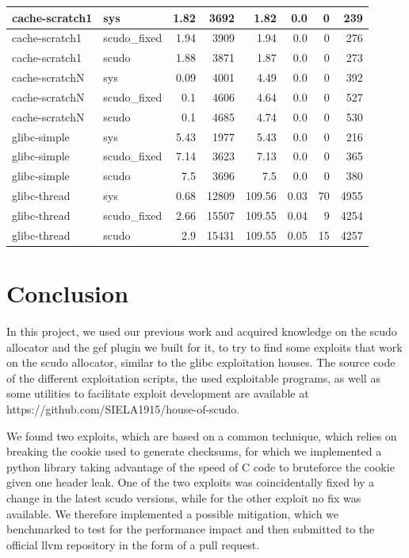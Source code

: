 \documentclass[a4paper,11pt,oneside]{report}
\begin{document}
\begin{longtable}[h]{l l r r r r r r}
  \midrule
  cache-scratch1 & sys & 1.82 & 3692 & 1.82 & 0.0 & 0 & 239 \\
  \midrule
  cache-scratch1 & scudo\_fixed & 1.94 & 3909 & 1.94 & 0.0 & 0 & 276 \\
  \midrule
  cache-scratch1 & scudo & 1.88 & 3871 & 1.87 & 0.0 & 0 & 273 \\
  \midrule
  cache-scratchN & sys & 0.09 & 4001 & 4.49 & 0.0 & 0 & 392 \\
  \midrule
  cache-scratchN & scudo\_fixed & 0.1 & 4606 & 4.64 & 0.0 & 0 & 527 \\
  \midrule
  cache-scratchN & scudo & 0.1 & 4685 & 4.74 & 0.0 & 0 & 530 \\
  \midrule
  glibc-simple & sys & 5.43 & 1977 & 5.43 & 0.0 & 0 & 216 \\
  \midrule
  glibc-simple & scudo\_fixed & 7.14 & 3623 & 7.13 & 0.0 & 0 & 365 \\
  \midrule
  glibc-simple & scudo & 7.5 & 3696 & 7.5 & 0.0 & 0 & 380 \\
  \midrule
  glibc-thread & sys & 0.68 & 12809 & 109.56 & 0.03 & 70 & 4955 \\
  \midrule
  glibc-thread & scudo\_fixed & 2.66 & 15507 & 109.55 & 0.04 & 9 & 4254 \\
  \midrule
  glibc-thread & scudo & 2.9 & 15431 & 109.55 & 0.05 & 15 & 4257 \\
  \bottomrule
\end{longtable}


\chapter{Conclusion}

In this project, we used our previous work and acquired knowledge on the scudo allocator
and the gef plugin we built for it, to try to find some exploits that work on the scudo
allocator, similar to the glibc exploitation houses. The source code of the different
exploitation scripts, the used exploitable programs, as well as some utilities to
facilitate exploit development are available at
https://github.com/SIELA1915/house-of-scudo.

We found two exploits, which are based on a common technique, which relies on breaking the
cookie used to generate checksums, for which we implemented a python library taking
advantage of the speed of C code to bruteforce the cookie given one header leak. One of
the two exploits was coincidentally fixed by a change in the latest scudo versions, while
for the other exploit no fix was available. We therefore implemented a possible
mitigation, which we benchmarked to test for the performance impact and then submitted to
the official llvm repository in the form of a pull request.


\cleardoublepage{}
\printbibliography{}
\end{document}
